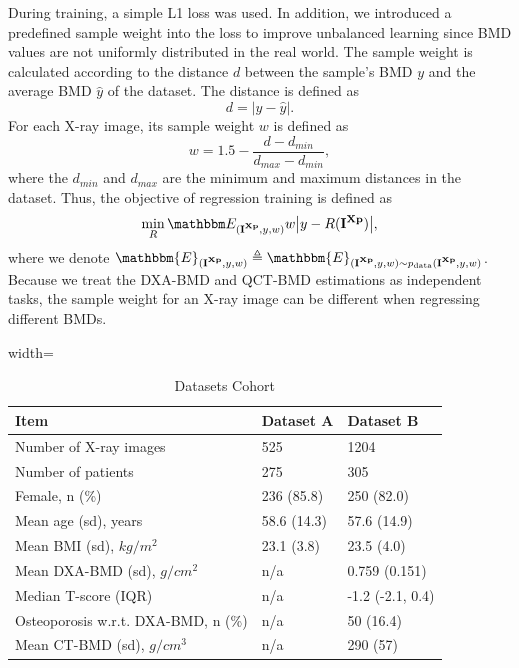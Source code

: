 \documentclass[times,twocolumn,final]{elsarticle}
\begin{document}
{During training, a simple L1 loss was used.
In addition, we introduced a predefined sample weight into the loss to improve unbalanced learning since BMD values are not uniformly distributed in the real world.
The sample weight is calculated according to the distance $d$ between the sample's BMD $y$ and the average BMD $\hat{y}$ of the dataset.
The distance is defined as
\begin{equation}
    d=|y-\hat{y}|.
\end{equation}
For each X-ray image, its sample weight $w$ is defined as
\begin{equation}
    w=1.5-\frac{d-d_{min}}{d_{max}-d_{min}},
\end{equation}
where the $d_{min}$ and $d_{max}$ are the minimum and maximum distances in the dataset.
Thus, the objective of regression training is defined as
\begin{equation}
    \min_{R}\mathbbm E_{(\imgxray,y,w)}w\bigl|y-R(\imgxray)\bigr|,
\end{equation}
where we denote $\mathbbm{E}_{(\imgxray,y,w)}\triangleq\mathbbm{E}_{(\imgxray,y,w)\sim p_{\mathrm{data}}(\imgxray,y,w)}$.
Because we treat the DXA-BMD and QCT-BMD estimations as independent tasks, the sample weight for an X-ray image can be different when regressing different BMDs.
}
\begin{table}[!t]
\caption{Datasets Cohort}
\centering
\begin{adjustbox}{width=\columnwidth}
\begin{tabular}{lll}
Item                                    & Dataset A    & Dataset B \\ \hline
Number of X-ray images                  & 525          & 1204  \\
Number of patients                      & 275          & 305   \\
Female, n (\%)                          & 236 (85.8)   & 250 (82.0)    \\
Mean age (sd), years                    & 58.6 (14.3)  & 57.6 (14.9)   \\
Mean BMI (sd), $kg/m^2$                 & 23.1 (3.8)          & 23.5 (4.0)  \\
Mean DXA-BMD (sd), $g/cm^2$             & n/a          & 0.759 (0.151)   \\
Median T-score (IQR)                    & n/a          & -1.2 (-2.1, 0.4)   \\
Osteoporosis w.r.t. DXA-BMD, n (\%)     & n/a          & 50 (16.4)   \\
Mean CT-BMD (sd), $g/cm^3$              & n/a          & 290 (57)  
\end{tabular}
\end{adjustbox}
\label{table:dataset}
\end{table}
\end{document}
